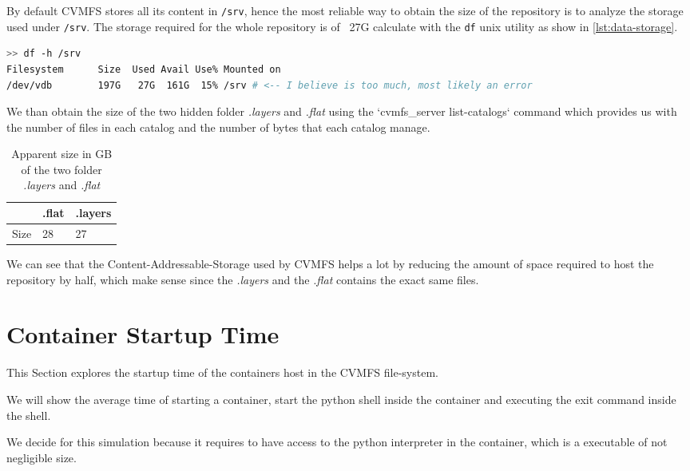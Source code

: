 By default CVMFS stores all its content in \texttt{/srv}, hence the most
reliable way to obtain the size of the repository is to analyze the storage
used under \texttt{/srv}. The storage required for the whole repository is of
~27G calculate with the \texttt{df} unix utility as show in
\ref{lst:data-storage}.

\begin{minipage}{\linewidth}
\begin{lstlisting}[language=bash,caption={Storage require to store the whole repository},label={lst:data-storage}]
>> df -h /srv
Filesystem      Size  Used Avail Use% Mounted on
/dev/vdb        197G   27G  161G  15% /srv # <-- I believe is too much, most likely an error
\end{lstlisting}
\end{minipage}

We than obtain the size of the two hidden folder \textit{.layers} and
\textit{.flat} using the `cvmfs\_server list-catalogs` command which provides us
with the number of files in each catalog and the number of bytes that each
catalog manage.

\begin{table}[]
\begin{tabular}{|l|ll|}
\hline
     & .flat & .layers \\ \hline
Size & 28    & 27      \\ \hline
\end{tabular}
\caption{Apparent size in GB of the two folder \textit{.layers} and \textit{.flat}}
\label{tab:size-of-repo}
\end{table}

We can see that the Content-Addressable-Storage used by CVMFS helps a lot by
reducing the amount of space required to host the repository by half, which
make sense since the \textit{.layers} and the \textit{.flat} contains the exact
same files.

\section{Container Startup Time}

This Section explores the startup time of the containers host in the CVMFS
file-system.

We will show the average time of starting a container, start the python shell
inside the container and executing the exit command inside the shell.

We decide for this simulation because it requires to have access to  the python
interpreter in the container, which is a executable of not negligible size.

